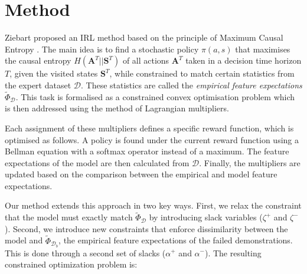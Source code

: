 \documentclass[conference]{IEEEtran}
\begin{document}
\section{Method}
Ziebart proposed an IRL method based on the principle of Maximum Causal Entropy \cite{ziebart2010modelingthesis}.  The main idea is to find a stochastic policy $\pi(a,s)$ that maximises the causal entropy $H(\mathbf{A}^T||\mathbf{S}^T)$ of all actions $\mathbf{A}^T$ taken in a decision time horizon $T$, given the visited states $\mathbf{S}^T$, while constrained to match certain statistics from the expert dataset $\mathcal{D}$. These statistics are called the \emph{empirical feature expectations} $\widetilde{\Phi}_{\mathcal{D}}$. This task is formalised as a constrained convex optimisation problem which is then addressed using the method of Lagrangian multipliers.  

Each assignment of these multipliers defines a specific reward function, which is optimised as follows. A policy is found under the current reward function using a Bellman equation with a softmax operator instead of a maximum.  The feature expectations of the model are then calculated from $\mathcal{D}$. Finally, the multipliers are updated based on the comparison between the empirical and model feature expectations.

Our method extends this approach in two key ways. First, we relax the constraint that the model must exactly match $\widetilde{\Phi}_{\mathcal{D}}$ by introducing slack variables ($\zeta^+$ and $\zeta^-$).  Second, we introduce new constraints that enforce dissimilarity between the model and $\widetilde{\Phi}_{\mathcal{D}_b}$, the empirical feature expectations of the failed demonstrations. This is done through a second set of slacks ($\alpha^+$ and $\alpha^-$). The resulting constrained optimization problem is:
	
\end{document}
